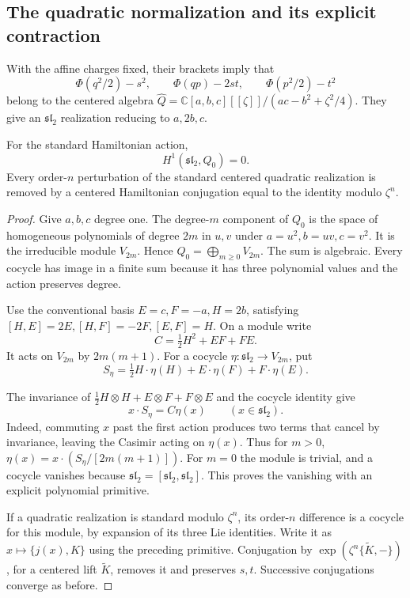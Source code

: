 \subsection{The quadratic normalization and its explicit contraction}

With the affine charges fixed, their brackets imply that
\[
 \Phi(q^2/2)-s^2,\qquad
 \Phi(qp)-2st,\qquad
 \Phi(p^2/2)-t^2
\]
belong to the centered algebra
$\widehat Q=\mathbb C[a,b,c][[\zeta]]/(ac-b^2+\zeta^2/4)$.
They give an $\mathfrak{sl}_2$ realization reducing to $a,2b,c$.

\begin{lemma}\label{mht:frgl:lem:quadratic-normalization}
For the standard Hamiltonian action,
\[
 H^1(\mathfrak{sl}_2,Q_0)=0.
\]
Every order-$n$ perturbation of the standard centered quadratic
realization is removed by a centered Hamiltonian conjugation
equal to the identity modulo $\zeta^n$.
\end{lemma}

\begin{proof}
Give $a,b,c$ degree one. The degree-$m$ component of $Q_0$
is the space of homogeneous polynomials of degree $2m$ in
$u,v$ under $a=u^2,b=uv,c=v^2$. It is the irreducible module
$V_{2m}$. Hence $Q_0=\bigoplus_{m\ge0}V_{2m}$. The sum is
algebraic. Every cocycle has image in a finite sum because it
has three polynomial values and the action preserves degree.

Use the conventional basis
$E=c,F=-a,H=2b$, satisfying
$[H,E]=2E,[H,F]=-2F,[E,F]=H$.
On a module write
\[
 C=\tfrac12H^2+EF+FE.
\]
It acts on $V_{2m}$ by $2m(m+1)$. For a cocycle
$\eta:\mathfrak{sl}_2\to V_{2m}$, put
\[
 S_\eta=\tfrac12H\cdot\eta(H)
          +E\cdot\eta(F)+F\cdot\eta(E).
\]

The invariance of
$\frac12H\otimes H+E\otimes F+F\otimes E$ and the cocycle
identity give
\[
 x\cdot S_\eta=C\eta(x)
 \qquad(x\in\mathfrak{sl}_2).
\]
Indeed, commuting $x$ past the first action produces two terms
that cancel by invariance, leaving the Casimir acting on
$\eta(x)$. Thus for $m>0$,
$\eta(x)=x\cdot(S_\eta/[2m(m+1)])$.
For $m=0$ the module is trivial, and a cocycle vanishes because
$\mathfrak{sl}_2=[\mathfrak{sl}_2,\mathfrak{sl}_2]$.
This proves the vanishing with an explicit polynomial primitive.

If a quadratic realization is standard modulo $\zeta^n$, its
order-$n$ difference is a cocycle for this module, by expansion
of its three Lie identities. Write it as $x\mapsto\{j(x),K\}$
using the preceding primitive. Conjugation by
$\exp(\zeta^n\{\widetilde K,-\})$, for a centered lift
$\widetilde K$, removes it and preserves $s,t$.
Successive conjugations converge as before.
\end{proof}

